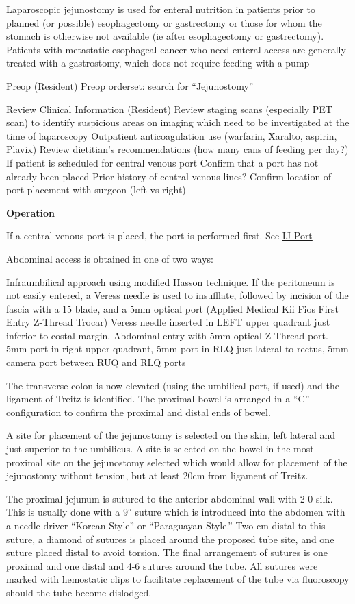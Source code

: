\documentclass[
  letterpaper,
]{scrbook}
\begin{document}
Laparoscopic jejunostomy is used for enteral nutrition in patients prior
to planned (or possible) esophagectomy or gastrectomy or those for whom
the stomach is otherwise not available (ie after esophagectomy or
gastrectomy). Patients with metastatic esophageal cancer who need
enteral access are generally treated with a gastrostomy, which does not
require feeding with a pump

Preop (Resident) Preop orderset: search for ``Jejunostomy''

Review Clinical Information (Resident) Review staging scans (especially
PET scan) to identify suspicious areas on imaging which need to be
investigated at the time of laparoscopy Outpatient anticoagulation use
(warfarin, Xaralto, aspirin, Plavix) Review dietitian's recommendations
(how many cans of feeding per day?) If patient is scheduled for central
venous port Confirm that a port has not already been placed Prior
history of central venous lines? Confirm location of port placement with
surgeon (left vs right)

\textbf{Operation}

If a central venous port is placed, the port is performed first. See
\hyperref[cv_port_salo]{IJ Port}

Abdominal access is obtained in one of two ways:

Infraumbilical approach using modified Hasson technique. If the
peritoneum is not easily entered, a Veress needle is used to insufflate,
followed by incision of the fascia with a 15 blade, and a 5mm optical
port (Applied Medical Kii Fios First Entry Z-Thread Trocar) Veress
needle inserted in LEFT upper quadrant just inferior to costal margin.
Abdominal entry with 5mm optical Z-Thread port. 5mm port in right upper
quadrant, 5mm port in RLQ just lateral to rectus, 5mm camera port
between RUQ and RLQ ports

The transverse colon is now elevated (using the umbilical port, if used)
and the ligament of Treitz is identified. The proximal bowel is arranged
in a ``C'' configuration to confirm the proximal and distal ends of
bowel.

A site for placement of the jejunostomy is selected on the skin, left
lateral and just superior to the umbilicus. A site is selected on the
bowel in the most proximal site on the jejunostomy selected which would
allow for placement of the jejunostomy without tension, but at least
20cm from ligament of Treitz.

The proximal jejunum is sutured to the anterior abdominal wall with 2-0
silk. This is usually done with a 9″ suture which is introduced into the
abdomen with a needle driver ``Korean Style'' or ``Paraguayan Style.''
Two cm distal to this suture, a diamond of sutures is placed around the
proposed tube site, and one suture placed distal to avoid torsion. The
final arrangement of sutures is one proximal and one distal and 4-6
sutures around the tube. All sutures were marked with hemostatic clips
to facilitate replacement of the tube via fluoroscopy should the tube
become dislodged.
\end{document}

